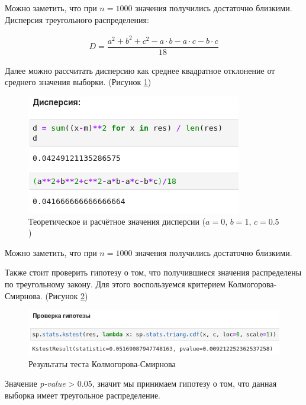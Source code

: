 \documentclass[14pt,fleqn]{extarticle}
\begin{document}
	Можно заметить, что при $n = 1000$ значения получились достаточно близкими.\\
	Дисперсия треугольного распределения:
	\begin{ceqn}
		\begin{align*}
			D = \dfrac{a^2 + b^2 +c^2 - a \cdot b - a \cdot c - b \cdot c}{18}
		\end{align*}
	\end{ceqn}
	Далее можно рассчитать дисперсию как среднее квадратное отклонение от среднего значения выборки. (Рисунок \ref{fig:triangle_inverse_function_method_var})
	\begin{figure}[h]
		\centering \includegraphics[scale=0.7]{triangle_inverse_function_method_var}
		\caption{Теоретическое и расчётное значения дисперсии ($a = 0$, $b = 1$, $c = 0.5$)}
		\label{fig:triangle_inverse_function_method_var}
	\end{figure}
	
	Можно заметить, что при $n = 1000$ значения получились достаточно близкими.
	
	\newpage
	
   	Также стоит проверить гипотезу о том, что получившиеся значения распределены по треугольному закону. Для этого воспользуемся критерием Колмогорова-Смирнова. (Рисунок \ref{fig:triangle_inverse_function_method_test})
	\begin{figure}[h]
		\centering \includegraphics[scale=0.6]{triangle_inverse_function_method_test}
		\caption{Результаты теста Колмогорова-Смирнова}
		\label{fig:triangle_inverse_function_method_test}
	\end{figure}
	
	Значение \textit{p-value} > 0.05, значит мы принимаем гипотезу о том, что данная выборка имеет треугольное распределение.
	
\end{document}
